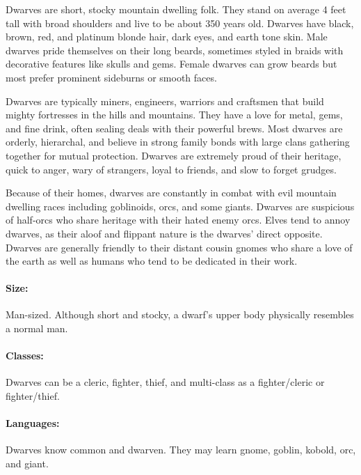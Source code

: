 \begin{multicols}{2}
Dwarves are short, stocky mountain dwelling folk.  They stand on average 4 feet tall with broad shoulders and live to be about 350 years old.  Dwarves have black, brown, red, and platinum blonde hair, dark eyes, and earth tone skin.  Male dwarves pride themselves on their long beards, sometimes styled in braids with decorative features like skulls and gems.  Female dwarves can grow beards but most prefer prominent sideburns or smooth faces.  

Dwarves are typically miners, engineers, warriors and craftsmen that build mighty fortresses in the hills and mountains.  They have a love for metal, gems, and fine drink, often sealing deals with their powerful brews.  Most dwarves are orderly, hierarchal, and believe in strong family bonds with large clans gathering together for mutual protection.  Dwarves are extremely proud of their heritage, quick to anger, wary of strangers, loyal to friends, and slow to forget grudges.

Because of their homes, dwarves are constantly in combat with evil mountain dwelling races including goblinoids, orcs, and some giants.  Dwarves are suspicious of half-orcs who share heritage with their hated enemy orcs.  Elves tend to annoy dwarves, as their aloof and flippant nature is the dwarves' direct opposite.  Dwarves are generally friendly to their distant cousin gnomes who share a love of the earth as well as humans who tend to be dedicated in their work.

\paragraph{Size:} Man-sized.  Although short and stocky, a dwarf's upper body physically resembles a normal man.
 
\paragraph{Classes:} Dwarves can be a cleric, fighter, thief, and multi-class as a fighter/cleric or fighter/thief.

\paragraph{Languages:} Dwarves know common and dwarven.  They may learn gnome, goblin, kobold, orc, and giant.

\end{multicols}

